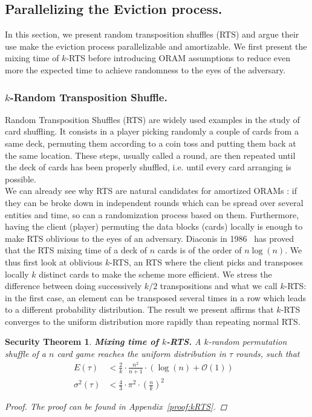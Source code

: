 \documentclass{llncs}
\newtheorem{secthm}{Security Theorem}
\begin{document}
\subsection{Parallelizing the Eviction process.}\label{Parallel}
In this section, we present random transposition shuffles (RTS) and argue their use make the eviction process parallelizable and amortizable.
We first present the mixing time of $k$-RTS before introducing ORAM assumptions to reduce even more the expected time to achieve randomness to the eyes of the adversary.
%
\subsubsection{$k$-Random Transposition Shuffle.}\label{kRTS}
Random Transposition Shuffles (RTS) are widely used examples in the study of card shuffling. It consists in a player picking randomly a couple of cards from a same deck, permuting them according to a coin toss and putting them back at the same location.
These steps, usually called a round, are then repeated until the deck of cards has been properly shuffled, i.e. until every card arranging is possible.\\
We can already see why RTS are natural candidates for amortized ORAMs : if they can be broke down in independent rounds which can be spread over several entities and time, so can a randomization process based on them. Furthermore, having the client (player) permuting the data blocks (cards) locally is enough to make RTS oblivious to the eyes of an adversary.
Diaconis in 1986~\cite{aldous1986shuffling} has proved that the RTS mixing time of a deck of $n$ cards is of the order of $n\log(n)$. We thus first look at oblivious $k$-RTS, an RTS where the client picks and transposes locally $k$ distinct cards to make the scheme more efficient. We stress the difference between doing successively $k/2$ transpositions and what we call $k$-RTS: in the first case, an element can be transposed several times in a row which leads to a different probability distribution. The result we present affirms that  $k$-RTS converges to the uniform distribution more rapidly than repeating normal RTS.  

\begin{secthm}
\textbf{Mixing time of $k$-RTS.} A $k$-random permutation shuffle of a $n$ card game reaches the uniform distribution in $\tau$ rounds, such that
\begin{align*}
E(\tau) &< \frac{2}{k}\cdot\frac{n^2}{n+1}\cdot \left ( \log(n) + \mathcal{O}(1) \right ) &\\
\sigma^2(\tau) &< \frac{4}{3} \cdot {\pi}^2 \cdot \left ( \frac{n}{k} \right )^2 &
\end{align*}
\begin{proof}
The proof can be found in Appendix~\ref{proof:kRTS}.
\end{proof}
\end{secthm}
\end{document}
